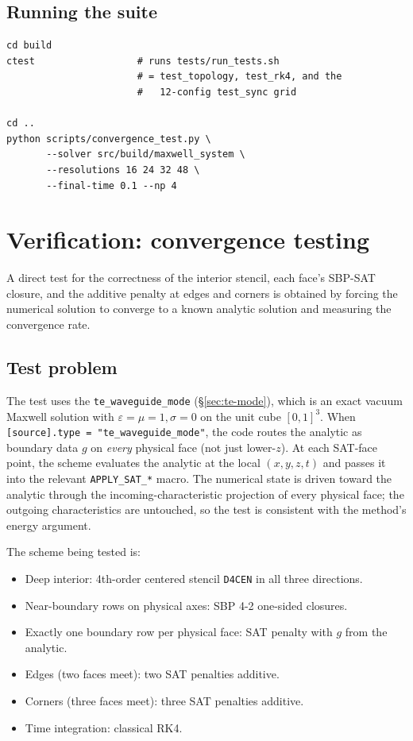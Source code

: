 \documentclass[11pt]{article}
\newcommand{\eps}{\varepsilon}
\begin{document}
\subsection{Running the suite}

\begin{lstlisting}[style=shell]
cd build
ctest                  # runs tests/run_tests.sh
                       # = test_topology, test_rk4, and the
                       #   12-config test_sync grid

cd ..
python scripts/convergence_test.py \
       --solver src/build/maxwell_system \
       --resolutions 16 24 32 48 \
       --final-time 0.1 --np 4
\end{lstlisting}

\section{Verification: convergence testing}
\label{sec:convergence}

A direct test for the correctness of the interior stencil, each
face's SBP-SAT closure, and the additive penalty at edges and
corners is obtained by forcing the numerical solution to converge
to a known analytic solution and measuring the convergence rate.

\subsection{Test problem}

The test uses the \texttt{te\_waveguide\_mode} (\S\ref{sec:te-mode}),
which is an exact vacuum Maxwell solution with
$\eps = \mu = 1, \sigma = 0$ on the unit cube $[0,1]^3$.  When
\texttt{[source].type = "te\_waveguide\_mode"}, the code routes
the analytic as boundary data $g$ on \emph{every} physical face
(not just lower-$z$).  At each SAT-face point, the scheme
evaluates the analytic at the local $(x, y, z, t)$ and passes it
into the relevant \texttt{APPLY\_SAT\_*} macro.  The numerical
state is driven toward the analytic through the
incoming-characteristic projection of every physical face; the
outgoing characteristics are untouched, so the test is consistent
with the method's energy argument.

The scheme being tested is:
\begin{itemize}[itemsep=1pt,topsep=2pt]
  \item Deep interior: 4th-order centered stencil \texttt{D4CEN}
        in all three directions.
  \item Near-boundary rows on physical axes: SBP 4-2 one-sided
        closures.
  \item Exactly one boundary row per physical face: SAT penalty
        with $g$ from the analytic.
  \item Edges (two faces meet): two SAT penalties additive.
  \item Corners (three faces meet): three SAT penalties additive.
  \item Time integration: classical RK4.
\end{itemize}
\end{document}
